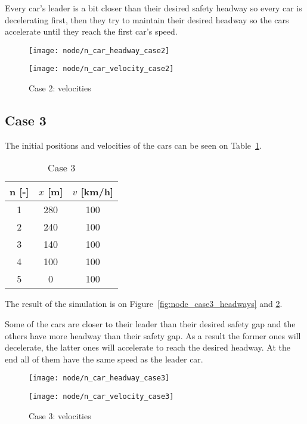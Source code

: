 		Every car's leader is a bit closer than their desired safety headway so every car is decelerating first, then they try to maintain their desired headway so the cars accelerate until they reach the first car's speed.
		\begin{figure}
			\centering
			\begin{minipage}{.5\textwidth}
				\centering
				\texttt{[image: node/n\_car\_headway\_case2]}
				\caption{Case 2: headways}
				\label{fig:node_case2_headways}
			\end{minipage}\hfill
			\begin{minipage}{.5\textwidth}
				\centering
				\texttt{[image: node/n\_car\_velocity\_case2]}
				\caption{Case 2: velocities}
				\label{fig:node_case2_velocities}
			\end{minipage}
		\end{figure}
		\subsection*{Case 3}
		The initial positions and velocities of the cars can be seen on Table~\ref{tab:node_case3}.
		\begin{table}
			\centering
			\begin{tabular}{ |c|c|c| }
				\hline
				n [-] & $x$ [m] & $v$ [km/h]\\
				\hline
				1 & 280 & 100 \\
				2 & 240 & 100 \\
				3 & 140 & 100 \\
				4 & 100 & 100 \\
				5 & 0 & 100 \\
				\hline
			\end{tabular}
			\caption{Case 3}
			\label{tab:node_case3}
		\end{table}
		The result of the simulation is on Figure~\ref{fig:node_case3_headways} and \ref{fig:node_case3_velocities}. 

		Some of the cars are closer to their leader than their desired safety gap and the others have more headway than their safety gap. As a result the former ones will decelerate, the latter ones will accelerate to reach the desired headway. At the end all of them have the same speed as the leader car.
		\begin{figure}
			\centering
			\begin{minipage}{.5\textwidth}
				\centering
				\texttt{[image: node/n\_car\_headway\_case3]}
				\caption{Case 3: headways}
				\label{fig:node_case3_headways}
			\end{minipage}\hfill
			\begin{minipage}{.5\textwidth}
				\centering
				\texttt{[image: node/n\_car\_velocity\_case3]}
				\caption{Case 3: velocities}
				\label{fig:node_case3_velocities}
			\end{minipage}
		\end{figure}

